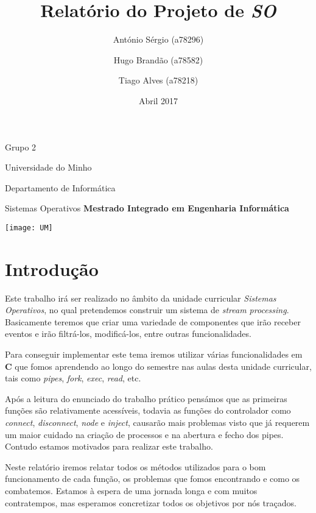 \documentclass{article}
\title{\bf{\textcolor{Mahogany}{Relatório do Projeto de \emph{SO}}}}
\author{António Sérgio (a78296) \and Hugo Brandão (a78582) \and Tiago Alves (a78218) }
\date{Abril 2017}
\begin{document}
\maketitle
\begin{center}

\par
\large {Grupo 2}
\par
\large {Universidade do Minho}
\par
\large {Departamento de Informática}
\par
\large {Sistemas Operativos}
\vfill
\bf Mestrado Integrado em Engenharia Informática
\par
\texttt{[image: UM]}
\end{center}

\clearpage

\tableofcontents

\clearpage
\section{Introdução}
\par Este trabalho irá ser realizado no âmbito da unidade curricular \emph{Sistemas Operativos}, no qual pretendemos construir um sistema de \emph{stream processing}. Basicamente teremos que criar uma variedade de componentes que irão receber eventos e irão filtrá-los, modificá-los, entre outras funcionalidades.

\par Para conseguir implementar este tema iremos utilizar várias funcionalidades em \textbf{C} que fomos aprendendo ao longo do semestre nas aulas desta unidade curricular, tais como \emph{pipes}, \emph{fork}, \emph{exec}, \emph{read}, etc.

\par Após a leitura do enunciado do trabalho prático pensámos que as primeiras funções são relativamente acessíveis, todavia as funções do controlador como \emph{connect}, \emph{disconnect}, \emph{node} e \emph{inject}, causarão mais problemas visto que já requerem um maior cuidado na criação de processos e na abertura e fecho dos pipes. Contudo estamos motivados para realizar este trabalho.

\par Neste relatório iremos relatar todos os métodos utilizados para o bom funcionamento de cada função, os problemas que fomos encontrando e como os combatemos. Estamos à espera de uma jornada longa e com muitos contratempos, mas esperamos concretizar todos os objetivos por nós traçados.
\end{document}
